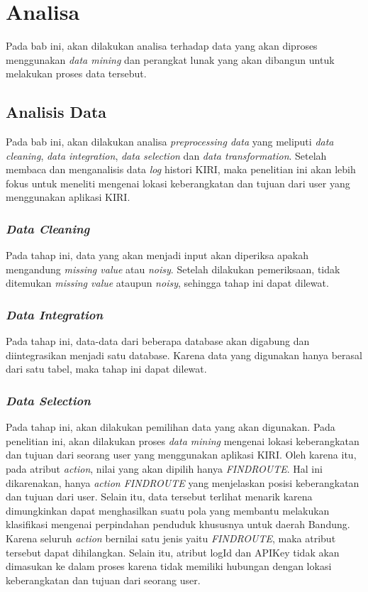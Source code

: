 \chapter{Analisa}

Pada bab ini, akan dilakukan analisa terhadap data yang akan diproses menggunakan \textsl{data mining} dan perangkat lunak yang akan dibangun untuk melakukan proses data tersebut.

\section{Analisis Data}
\label{analisisData}
Pada bab ini, akan dilakukan analisa \textsl{preprocessing data} yang meliputi \textsl{data cleaning}, \textsl{data integration}, \textsl{data selection} dan \textsl{data transformation}. Setelah membaca dan menganalisis data \textsl{log} histori KIRI, maka penelitian ini akan lebih fokus untuk meneliti mengenai lokasi keberangkatan dan tujuan dari user yang menggunakan aplikasi KIRI.

\subsection{\textsl{Data Cleaning}}
Pada tahap ini, data yang akan menjadi input akan diperiksa apakah mengandung \textsl{missing value} atau \textsl{noisy}. Setelah dilakukan pemeriksaan, tidak ditemukan \textsl{missing value} ataupun \textsl{noisy}, sehingga tahap ini dapat dilewat.

\subsection{\textsl{Data Integration}}
Pada tahap ini, data-data dari beberapa database akan digabung dan diintegrasikan menjadi satu database. Karena data yang digunakan hanya berasal dari satu tabel, maka tahap ini dapat dilewat.

\subsection{\textsl{Data Selection}}
Pada tahap ini, akan dilakukan pemilihan data yang akan digunakan. Pada penelitian ini, akan dilakukan proses \textsl{data mining} mengenai lokasi keberangkatan dan tujuan dari seorang user yang menggunakan aplikasi KIRI. Oleh karena itu, pada atribut \textsl{action}, nilai yang akan dipilih hanya \textsl{FINDROUTE}. Hal ini dikarenakan, hanya \textsl{action FINDROUTE} yang menjelaskan posisi keberangkatan dan tujuan dari user. Selain itu, data tersebut terlihat menarik karena dimungkinkan dapat menghasilkan suatu pola yang membantu melakukan klasifikasi mengenai perpindahan penduduk khususnya untuk daerah Bandung. Karena seluruh \textsl{action} bernilai satu jenis yaitu \textsl{FINDROUTE}, maka atribut tersebut dapat dihilangkan. Selain itu, atribut logId dan APIKey tidak akan dimasukan ke dalam proses karena tidak memiliki hubungan dengan lokasi keberangkatan dan tujuan dari seorang user.

